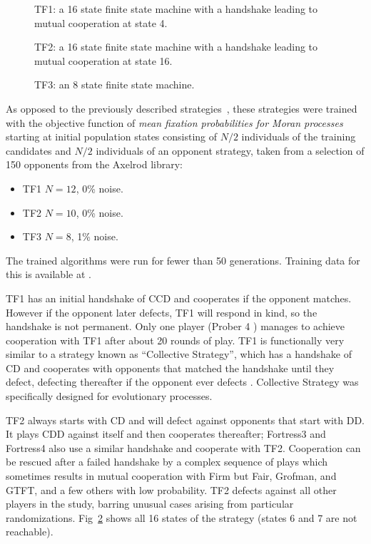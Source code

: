 \documentclass[10pt,letterpaper]{article}
\begin{document}
\begin{figure}[!hbtp]
    \centering
    \caption{TF1: a 16 state finite state machine with a handshake leading to
    mutual cooperation at state 4.}
    \label{fig:tf1}
\end{figure}


\begin{figure}[!hbtp]
    \centering
    \caption{TF2: a 16 state finite state machine with a handshake leading to
    mutual cooperation at state 16.}
    \label{fig:tf2}
\end{figure}


\begin{figure}[!hbtp]
    \centering
    \caption{TF3: an 8 state finite state machine.}
    \label{fig:tf3}
\end{figure}

As opposed to the previously described strategies~\cite{Harper2017}, these
strategies were trained with the objective function of \textit{mean fixation
probabilities for Moran processes} starting at initial population states
consisting of \(N/2\) individuals of the training candidates and \(N/2\)
individuals of an opponent strategy, taken from a selection of 150 opponents
from the Axelrod library:

\begin{itemize}
	\item TF1 \(N=12\), 0\% noise.
	\item TF2 \(N=10\), 0\% noise.
	\item TF3 \(N=8\), 1\% noise.
\end{itemize}

The trained algorithms
were run for fewer than 50 generations. Training data for this is available at
\cite{data}.

TF1 has an initial handshake of CCD and cooperates if the opponent matches.
However if the opponent later defects, TF1 will respond in kind, so the
handshake is not permanent. Only one player (Prober 4 \cite{Prison1998}) manages to
achieve cooperation with TF1 after about 20 rounds of play. TF1 is functionally
very similar to a strategy known as ``Collective Strategy'', which has a
handshake of CD and cooperates with opponents that matched the handshake
until they defect, defecting thereafter if the opponent ever defects \cite{Li2009}.
Collective Strategy was specifically designed for evolutionary processes.

TF2 always starts with CD and will defect against opponents that start with
DD\@. It plays CDD against itself and then cooperates thereafter; Fortress3 and
Fortress4 also use a similar handshake and cooperate with TF2. Cooperation
can be rescued after a failed handshake by a complex sequence of plays
which sometimes results in mutual cooperation with Firm but Fair, Grofman, and
GTFT, and a few others with low probability. TF2 defects against all other
players in the study, barring
unusual cases arising from particular randomizations. Fig~\ref{fig:tf2} shows
all 16 states of the strategy (states 6 and 7 are not reachable).
\end{document}
